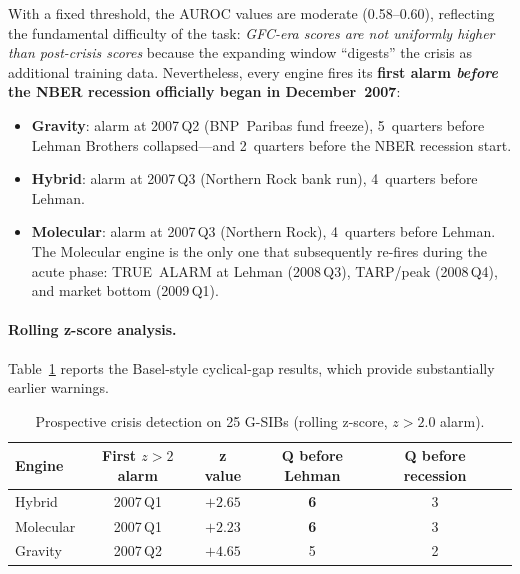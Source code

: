 With a fixed threshold, the AUROC values are moderate (0.58--0.60),
reflecting the fundamental difficulty of the task: \emph{GFC-era
scores are not uniformly higher than post-crisis scores} because
the expanding window ``digests'' the crisis as additional training
data.  Nevertheless, every engine fires its \textbf{first alarm
\emph{before} the NBER recession officially began in December~2007}:

\begin{itemize}
\item \textbf{Gravity}: alarm at 2007\,Q2 (BNP~Paribas fund freeze),
  5~quarters before Lehman Brothers collapsed---and 2~quarters before
  the NBER recession start.
\item \textbf{Hybrid}: alarm at 2007\,Q3 (Northern Rock bank run),
  4~quarters before Lehman.
\item \textbf{Molecular}: alarm at 2007\,Q3 (Northern Rock),
  4~quarters before Lehman.  The Molecular engine is the only one
  that subsequently re-fires during the acute phase: TRUE~ALARM at
  Lehman (2008\,Q3), TARP/peak (2008\,Q4), and market bottom
  (2009\,Q1).
\end{itemize}

\paragraph{Rolling z-score analysis.}
Table~\ref{tab:gsib_zscore} reports the Basel-style cyclical-gap
results, which provide substantially earlier warnings.

\begin{table}[ht]
\centering
\caption{Prospective crisis detection on 25 G-SIBs (rolling z-score,
$z > 2.0$ alarm).}
\label{tab:gsib_zscore}
\begin{tabular}{lccccc}
\hline
Engine     & First $z{>}2$ alarm & z value & Q before Lehman & Q before recession \\
\hline
Hybrid     & 2007\,Q1            & $+2.65$ & \textbf{6}      & 3 \\
Molecular  & 2007\,Q1            & $+2.23$ & \textbf{6}      & 3 \\
Gravity    & 2007\,Q2            & $+4.65$ & 5               & 2 \\
\hline
\end{tabular}
\end{table}

